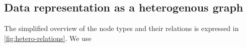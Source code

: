 \documentclass[english, 12pt, a4paper, sci, utf8, a-2b, online]{aaltothesis}
\begin{document}






\subsection{Data representation as a heterogenous graph}

The simplified overview of the node types and their relations is expressed in \cref{fig:hetero-relations}. We use 

% 
\end{document}
